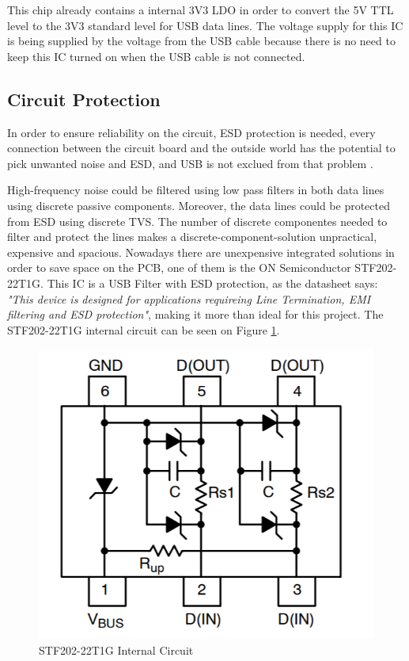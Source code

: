 		This chip already contains a internal 3V3 LDO in order to convert the 5V TTL level to the 3V3 standard level for USB data lines. The voltage supply for this IC is being supplied by the voltage from the USB cable because there is no need to keep this IC turned on when the USB cable is not connected.


	\subsection{Circuit Protection}\label{ssec:usb-uart-circuit-protection}
		In order to ensure reliability on the circuit, ESD protection is needed, every connection between the circuit board and the outside world has the potential to pick unwanted noise and ESD, and USB is not exclued from that problem \cite{circuit-protection-usb}.

		High-frequency noise could be filtered using low pass filters in both data lines using discrete passive components. Moreover, the data lines could be protected from ESD using discrete TVS. The number of discrete componentes needed to filter and protect the lines makes a discrete-component-solution unpractical, expensive and spacious. Nowadays there are unexpensive integrated solutions in order to save space on the PCB, one of them is the ON Semiconductor STF202-22T1G. This IC is a USB Filter with ESD protection, as the datasheet \cite{stf202-22t1g-datasheet} says: \textit{"This device is designed for applications requireing Line Termination, EMI filtering and ESD protection"}, making it more than ideal for this project. The STF202-22T1G internal circuit can be seen on Figure \ref{fig:stf202-22t1g-sch}.

		\begin{figure}[htbp]
			\centering
				\includegraphics[width=.8\textwidth]{figuras/fig-stf202-22t1g-sch}
			\caption{STF202-22T1G Internal Circuit \cite{stf202-22t1g-sch}}
			\label{fig:stf202-22t1g-sch}
		\end{figure}

